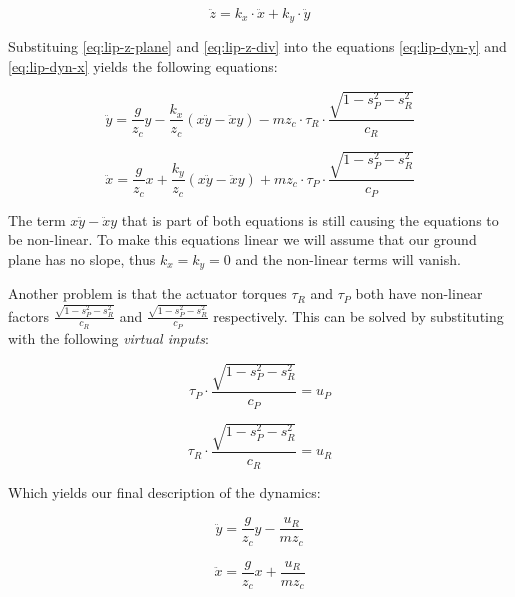 \documentclass[english,ngerman]{KITreprt}
\newcommand{\clr}[2]{{\color{#1}{#2}}}
\newcommand{\todo}[1]{\marginpar{\clr{red}{#1}}}
\begin{document}
\begin{equation} \label{eq:lip-z-div}
\ddot{z} = k_x \cdot \ddot{x} + k_y \cdot \ddot{y}
\end{equation}

Substituing \ref{eq:lip-z-plane} and \ref{eq:lip-z-div} into the
equations \ref{eq:lip-dyn-y} and \ref{eq:lip-dyn-x} yields the following
equations:

\begin{equation}
\ddot{y} = \frac{g}{z_c} y - \frac{k_x}{z_c} (x\ddot{y} - \ddot{x}y) - m z_c \cdot \tau_R \cdot \frac{\sqrt{1 - s_P^2 - s_R^2}}{c_R}
\end{equation}

\begin{equation}
\ddot{x} = \frac{g}{z_c} x + \frac{k_y}{z_c} (x\ddot{y} - \ddot{x}y) + m z_c \cdot \tau_P \cdot \frac{\sqrt{1 - s_P^2 - s_R^2}}{c_P}
\end{equation}

The term $x\ddot{y} - \ddot{x}y$ that is part of both equations is still
causing the equations to be non-linear. To make this equations linear we
will assume that our ground plane has no slope, thus $k_x = k_y = 0$ and
the non-linear terms will vanish.

Another problem is that the actuator torques $\tau_R$ and $\tau_P$ both
have non-linear factors $\frac{\sqrt{1 - s_P^2 - s_R^2}}{c_R}$ and
$\frac{\sqrt{1 - s_P^2 - s_R^2}}{c_P}$ respectively. This can be solved
by substituting with the following \emph{virtual inputs}:

\begin{equation}
\tau_P \cdot \frac{\sqrt{1 - s_P^2 - s_R^2}}{c_P} = u_P
\end{equation}

\begin{equation}
\tau_R \cdot \frac{\sqrt{1 - s_P^2 - s_R^2}}{c_R} = u_R
\end{equation}

Which yields our final description of the dynamics:

\begin{equation} \label{eq:lip-y}
\ddot{y} = \frac{g}{z_c} y - \frac{u_R}{m z_c}
\end{equation}

\begin{equation} \label{eq:lip-x}
\ddot{x} = \frac{g}{z_c} x + \frac{u_R}{m z_c}
\end{equation}

\todo{include pattern generation just based on 3D-LIPM, I don't understand how they derived the controller}
\end{document}
